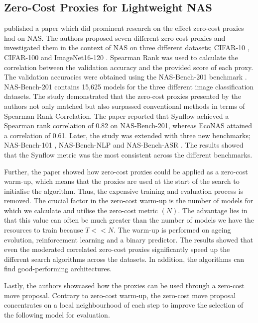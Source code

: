 \subsection{Zero-Cost Proxies for Lightweight NAS}\label{abdelfattah}
\cite{abdelfattah2021zero} published a paper which did prominent research on the effect zero-cost proxies had on \gls{NAS}. The authors proposed seven different zero-cost proxies and investigated them in the context of \gls{NAS} on three different datasets; CIFAR-10 \autocite{Krizhevsky2009LearningML}, CIFAR-100 \autocite{Krizhevsky2009LearningML} and ImageNet16-120 \autocite{deng2009imagenet}. Spearman Rank was used to calculate the correlation between the validation accuracy and the provided score of each proxy. The validation accuracies were obtained using the NAS-Bench-201 benchmark \autocite{dong2020bench}. NAS-Bench-201 contains 15,625 models for the three different image classification datasets. The study demonstrated that the zero-cost proxies presented by the authors not only matched but also surpassed conventional methods in terms of Spearman Rank Correlation. The paper reported that \gls{Synflow} achieved a Spearman rank correlation of 0.82 on NAS-Bench-201, whereas \gls{EcoNAS} attained a correlation of 0.61. Later, the study was extended with three new benchmarks; NAS-Bench-101 \autocite{ying2019bench}, NAS-Bench-NLP \autocite{https://doi.org/10.48550/arxiv.2006.07116} and NAS-Bench-ASR \autocite{mehrotra2021bench}. The results showed that the \gls{Synflow} metric was the most consistent across the different benchmarks. 

Further, the paper showed how zero-cost proxies could be applied as a zero-cost warm-up, which means that the proxies are used at the start of the search to initialise the algorithm. Thus, the expensive training and evaluation process is removed. The crucial factor in the zero-cost warm-up is the number of models for which we calculate and utilise the zero-cost metric $(N)$. The advantage lies in that this value can often be much greater than the number of models we have the resources to train because $T << N$. The warm-up is performed on ageing evolution, reinforcement learning and a binary predictor. The results showed that even the moderated correlated zero-cost proxies significantly speed up the different search algorithms across the datasets. In addition, the algorithms can find good-performing architectures. 

Lastly, the authors showcased how the proxies can be used through a zero-cost move proposal. Contrary to zero-cost warm-up, the zero-cost move proposal concentrates on a local neighbourhood of each step to improve the selection of the following model for evaluation. 